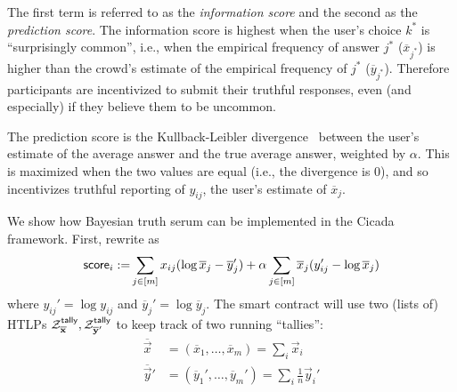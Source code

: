 The first term is referred to as the \emph{information score} and the second as the \emph{prediction score}. The information score is highest when the user's choice $k^*$ is ``surprisingly common'', i.e., when the empirical frequency of answer $j^*$ ($\overline{x}_{j^*}$) is higher than the crowd's estimate of the empirical frequency of $j^*$ ($\overline{y}_{j^*}$). Therefore participants are incentivized to submit their truthful responses, even (and especially) if they believe them to be uncommon. 

The prediction score is the Kullback-Leibler divergence~\cite{KulLei51} between the user's estimate of the average answer and the true average answer, weighted by $\alpha$. This is maximized when the two values are equal (i.e., the divergence is 0), and so incentivizes truthful reporting of $y_{ij}$, the user's estimate of $\overline{x}_j$. 

We show how Bayesian truth serum can be implemented in the Cicada framework. First, rewrite  as
%
\begin{equation}\label{eqn:bts-cicada}
    \begin{aligned}
        {\sf score}_i :=& \sum_{j \in [m]} x_{ij} (\log{\overline{x}_j}-\overline{y}_j') + \alpha \sum_{j \in [m]} \overline{x}_j (y_{ij}' - \log{\overline{x}_j})\\
    \end{aligned}
\end{equation}
%
where $y_{ij}' = \log{y_{ij}}$ and $\overline{y}_{j}' = \log{\overline{y}_j}$.
\def\tallyx{\ensuremath{\overline{\vec{x}}}}
\def\tallyy{\ensuremath{\overline{\vec{y}}'}}
The smart contract will use two (lists of) HTLPs $\Z_{\tallyx}^{\sf tally}, \Z_{\tallyy}^{\sf tally}$ to keep track of two running ``tallies'':
\begin{align*}
\tallyx &= (\overline{x}_1, \dots, \overline{x}_m) = \sum_i \vec{x}_i\\
\tallyy &= (\overline{y}_1', \dots, \overline{y}_m') = \sum_i \frac{1}{n} \vec{y}_i'
\end{align*}

